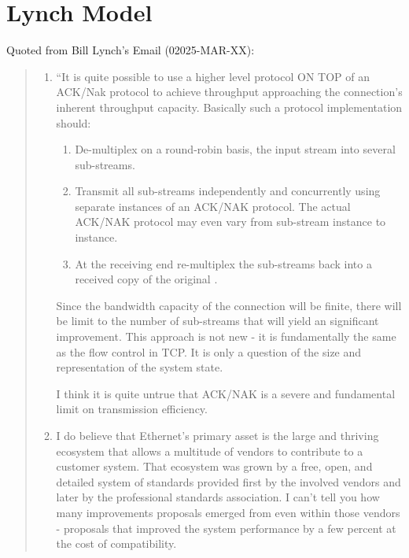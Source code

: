 \documentclass[../HFT-main.tex]{subfiles} %
\begin{document}
\section{Lynch Model}
Quoted  from Bill Lynch's Email (02025-MAR-XX):
\begin{quotation}
\begin{enumerate}
\item ``It is quite possible to use a higher level protocol ON TOP of an ACK/Nak protocol to achieve throughput approaching the connection's inherent throughput capacity.  Basically such a protocol implementation should:

\begin{enumerate}
	\item De-multiplex on a round-robin basis, the input stream into several sub-streams.
	\item Transmit all sub-streams independently and concurrently using separate instances of an ACK/NAK protocol.  The actual ACK/NAK protocol may even vary from sub-stream instance to instance. 
	\item At the receiving end re-multiplex the sub-streams back into a received copy of the original .
\end{enumerate}

Since the bandwidth capacity of the connection will be finite, there will be limit to the number of sub-streams that will yield an significant improvement.  This approach is not new - it is fundamentally the same as the flow control in TCP.  It is only a question of the size and representation of the system state.

I think it is quite untrue that ACK/NAK is a severe and fundamental limit on transmission efficiency.

\item  I do believe that Ethernet's primary asset is the large and thriving ecosystem that allows a multitude of vendors to contribute to a customer system.  That ecosystem was grown by a free, open, and detailed system of standards provided first by the involved vendors and later by the professional standards association.  I can't tell you how many improvements proposals emerged from even within those vendors - proposals that improved the system performance by a few percent at the cost of compatibility. 


\end{enumerate}
\end{quotation}
\end{document}
